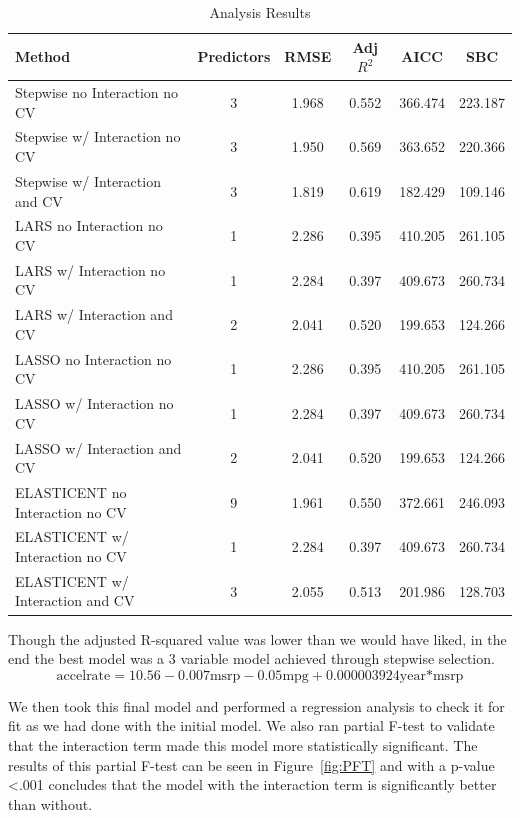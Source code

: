 \documentclass[acmsmall]{acmart}
\begin{document}
\begin{table}[H]
\centering
\begin{tabular}{|l|c|c|c|c|c|}
\hline
\rowcolor{lightgray}
\textbf{Method} & \textbf{Predictors} & \textbf{RMSE} & \textbf{Adj $R^2$} & \textbf{AICC} & \textbf{SBC}\\
\hline
Stepwise no Interaction no CV & 3 & 1.968 & 0.552 & 366.474 & 223.187\\
\hline
Stepwise w/ Interaction no CV & 3 & 1.950 & 0.569 & 363.652 & 220.366\\
\hline
\rowcolor{yellow}
Stepwise w/ Interaction and CV & 3 & 1.819 & 0.619 & 182.429 & 109.146\\
\hline
LARS no Interaction no CV & 1 & 2.286 & 0.395 & 410.205 & 261.105\\
\hline
LARS w/ Interaction no CV & 1 & 2.284 & 0.397 & 409.673 & 260.734\\
\hline
LARS w/ Interaction and CV & 2 & 2.041 & 0.520 & 199.653 & 124.266\\
\hline
LASSO no Interaction no CV & 1 & 2.286 & 0.395 & 410.205 & 261.105\\
\hline
LASSO w/ Interaction no CV & 1 & 2.284 & 0.397 & 409.673 & 260.734\\
\hline
LASSO w/ Interaction and CV & 2 & 2.041 & 0.520 & 199.653 & 124.266\\
\hline
ELASTICENT no Interaction no CV & 9 & 1.961 & 0.550 & 372.661 & 246.093\\
\hline
ELASTICENT w/ Interaction no CV & 1 & 2.284 & 0.397 & 409.673 & 260.734\\
\hline
ELASTICENT w/ Interaction and CV & 3 & 2.055 & 0.513 & 201.986 & 128.703\\
\hline
\end{tabular}
\caption{Analysis Results}
\label{tab:CCM}
\end{table}

Though the adjusted R-squared value was lower than we would have liked, in the end the best model was a 3 variable model achieved through stepwise selection.\\
$$ \text{accelrate} = 10.56 - 0.007 \text{msrp} - 0.05 \text{mpg} + 0.000003924 \text{year*msrp}$$

We then took this final model and performed a regression analysis to check it for fit as we had done with the initial model. We also ran  partial F-test to validate that the interaction term made this model more statistically significant. The results of this partial F-test can be seen in Figure~\ref{fig:PFT} and with a p-value <.001 concludes that the model with the interaction term is significantly better than without.
\end{document}
